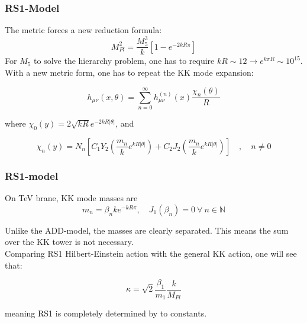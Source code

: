 \documentclass[10pt]{beamer}
\begin{document}
	\begin{frame}
		\frametitle{RS1-Model}
		The metric forces a new reduction formula:
		\begin{equation}
			M_{Pl}^2 = \frac{M_5^3}{k}\left[1-e^{-2kR\pi}\right]
		\end{equation}
		For $M_5$ to solve the hierarchy problem, one has to require $kR \sim 12 \rightarrow e^{k\pi R} \sim 10^{15}$.\\
		
		With a new metric form, one has to repeat the KK mode expansion:
		
		\begin{equation}
			h_{\mu\nu}(x,\theta) = \sum_{n=0}^\infty h_{\mu\nu}^{(n)}(x)\frac{\chi_n(\theta)}{R}
		\end{equation}
		
		where $\chi_0(y) = 2\sqrt{kR}e^{-2kR|\theta|}$, and
		
		\begin{equation}
			\chi_n(y) = N_n\left[ C_1Y_2\left(\frac{m_n}{k}e^{kR|\theta|}\right) +   C_2J_2\left(\frac{m_n}{k}e^{kR|\theta|}\right)\right] \quad,\quad n\neq 0
		\end{equation}
	\end{frame}
	
	\begin{frame}
		\frametitle{RS1-model}
		On TeV brane, KK mode masses are
		\begin{equation}
			m_n = \beta_n ke^{-kR\pi}, \quad J_1(\beta_n) = 0\:\forall\: n\in\mathbb{N}
		\end{equation}
		
		Unlike the ADD-model, the masses are clearly separated. This means the sum over the KK tower is not necessary.\\
		Comparing RS1 Hilbert-Einstein action with the general KK action, one will see that:
		
		\begin{equation}
			\kappa = \sqrt{2}\frac{\beta_1}{m_1}\frac{k}{M_{Pl}}
		\end{equation}
		
		meaning RS1 is completely determined by to constants.
	\end{frame}
	
\end{document}
